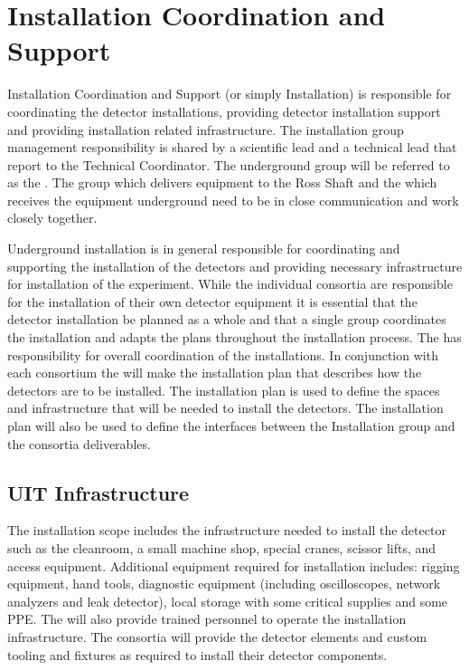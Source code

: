 \section{Installation Coordination and Support}
\label{sec:fdsp-coord-install}


Installation Coordination and Support (or simply Installation) is
responsible for coordinating the detector installations, providing
detector installation support and providing installation related
infrastructure. The installation group management responsibility is
shared by a scientific lead and a technical lead that report to the
Technical Coordinator. The underground group will be referred to as
the . The  group which delivers equipment to the
Ross Shaft and the  which receives the equipment
underground need to be in close communication and work closely
together.

Underground installation is in general responsible for coordinating
and supporting the installation of the detectors and providing
necessary infrastructure for installation of the experiment. While the
individual consortia are responsible for the installation of their own
detector equipment it is essential that the detector installation be
planned as a whole and that a single group coordinates the
installation and adapts the plans throughout the installation
process. The  has responsibility for overall coordination
of the installations. In conjunction with each consortium the
 will make the installation plan that describes how the
detectors are to be installed. The installation plan is used to define
the spaces and infrastructure that will be needed to install the
detectors. The installation plan will also be used to define the
interfaces between the Installation group and the consortia
deliverables.

\subsection{UIT Infrastructure}

The installation scope includes the infrastructure
needed to install the detector such as the cleanroom, a small machine
shop, special cranes, scissor lifts, and access equipment.  Additional
equipment required for installation includes: rigging equipment, hand
tools, diagnostic equipment (including oscilloscopes, network
analyzers and leak detector), local storage with some critical
supplies and some PPE. The  will also provide trained
personnel to operate the installation infrastructure. The consortia
will provide the detector elements and custom tooling and fixtures as
required to install their detector components.

